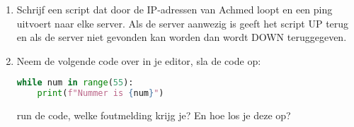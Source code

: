 \begin{enumerate}
\item Schrijf een script dat door de IP-adressen van Achmed loopt en een ping uitvoert naar elke server. Als de server aanwezig is geeft het script UP terug en als de server niet gevonden kan worden dan wordt DOWN teruggegeven.

\item Neem de volgende code over in je editor, sla de code op:
\begin{lstlisting}[language=python]
while num in range(55):
    print(f"Nummer is {num}")
\end{lstlisting}
run de code, welke foutmelding krijg je? En hoe los je deze op?

\end{enumerate}
